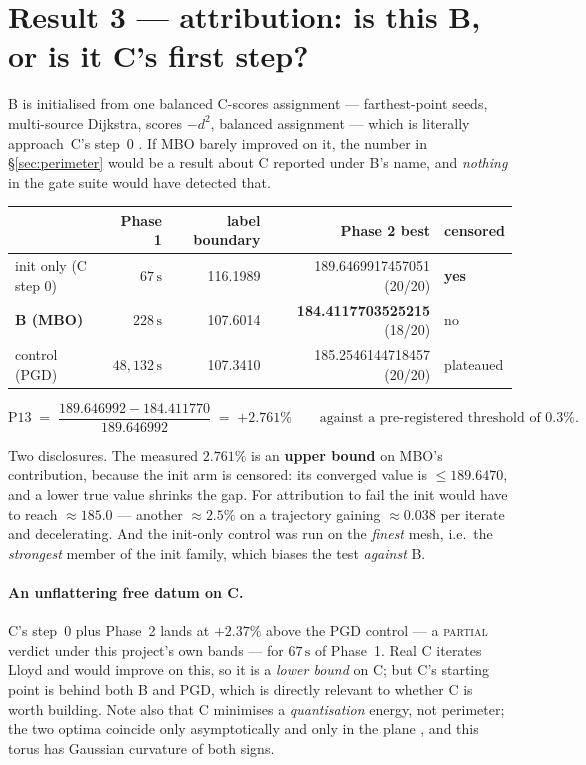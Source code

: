 \documentclass[11pt,a4paper]{article}
\begin{document}
\section{Result 3 --- attribution: is this B, or is it C's first step?}
\label{sec:attribution}

B is initialised from one balanced C-scores assignment --- farthest-point seeds,
multi-source Dijkstra, scores \(-d^2\), balanced assignment --- which is literally
approach~C's step~0 \cite{lloyd1982least, aurenhammer1998minkowski,
degoes2012bluenoise}. If MBO barely improved on it, the number in
\S\ref{sec:perimeter} would be a result about C reported under B's name, and
\emph{nothing} in the gate suite would have detected that.

\begin{center}\small
\begin{tabular}{@{}lrrrl@{}}
\toprule
 & Phase 1 & label boundary & Phase 2 best & censored \\
\midrule
init only (C step 0) & \(67\,\mathrm{s}\) & 116.1989 & 189.6469917457051 (20/20) & \textbf{yes} \\
\textbf{B (MBO)} & \(228\,\mathrm{s}\) & 107.6014 & \textbf{184.4117703525215} (18/20) & no \\
control (PGD) & \(48{,}132\,\mathrm{s}\) & 107.3410 & 185.2546144718457 (20/20) & plateaued \\
\bottomrule
\end{tabular}
\end{center}

\[
  \text{P13} \;=\; \frac{189.646992 - 184.411770}{189.646992} \;=\; \mathbf{+2.761\%}
  \qquad\text{against a pre-registered threshold of } 0.3\%.
\]

Two disclosures. The measured \(2.761\%\) is an \textbf{upper bound} on MBO's
contribution, because the init arm is censored: its converged value is
\(\le 189.6470\), and a lower true value shrinks the gap. For attribution to fail
the init would have to reach \(\approx 185.0\) --- another \(\approx 2.5\%\) on a
trajectory gaining \(\approx 0.038\) per iterate and decelerating. And the
init-only control was run on the \emph{finest} mesh, i.e.\ the \emph{strongest}
member of the init family, which biases the test \emph{against} B.

\paragraph{An unflattering free datum on C.} C's step~0 plus Phase~2 lands at
\(+2.37\%\) above the PGD control --- a \textsc{partial} verdict under this
project's own bands --- for \(67\,\mathrm{s}\) of Phase~1. Real C iterates Lloyd and
would improve on this, so it is a \emph{lower bound} on C; but C's starting point
is behind both B and PGD, which is directly relevant to whether C is worth building.
Note also that C minimises a \emph{quantisation} energy, not perimeter; the two
optima coincide only asymptotically and only in the plane
\cite{hales2001honeycomb, gersho1979asymptotically}, and this torus has Gaussian
curvature of both signs.
\end{document}
